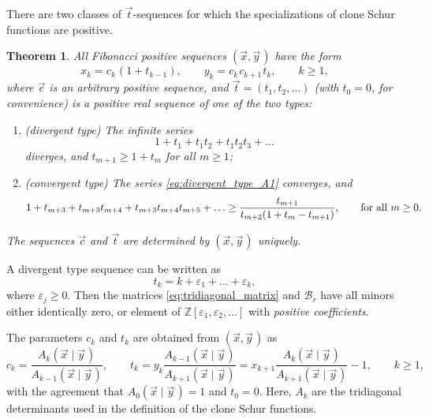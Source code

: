 \documentclass[letterpaper,11pt,oneside,reqno]{article}
\numberwithin{equation}{section}
\newcommand{\ssp}{\hspace{1pt}}
\newtheorem{theorem}[proposition]{Theorem}
\theoremstyle{definition}
\begin{document}
There are two classes of $\vec t$-sequences for which the
specializations of clone Schur functions are positive.
\begin{theorem}
	All Fibonacci positive sequences
	$(\vec x,\vec{y}\ssp)$
	have the form
	\begin{equation*}
		x_k=c_k\ssp (1+t_{k-1}),\qquad y_k=c_k\ssp c_{k+1}\ssp t_k, \qquad k\ge1,
	\end{equation*}
	where $\vec c$ is an
	arbitrary positive sequence,
	and $\vec t=(t_1,t_2,\ldots )$ (with $t_0=0$, for convenience) is
	a positive real sequence of one of the two types:
	\begin{enumerate}[$\bullet$]
		\item (divergent type)
			The infinite series
			\begin{equation}
				\label{eq:divergent_type_A1}
				1+t_1+t_1t_2+t_1t_2t_3+\ldots
			\end{equation}
			diverges, and
			$t_{m+1}\ge 1+t_m$ for all $m\ge 1$;
		\item (convergent type)
			The series \eqref{eq:divergent_type_A1} converges, and
			\begin{equation*}
				 1+t_{m+3}+t_{m+3}t_{m+4}+
				t_{m+3}t_{m+4}t_{m+5}+\ldots
				\ge
				\frac{t_{m+1}}{t_{m+2}(1+t_m-t_{m+1})}
				,
				\qquad
				\textnormal{for all }
				m\ge0.
			\end{equation*}
	\end{enumerate}
	The sequences $\vec c$ and $\vec t$ are determined by $(\vec x,\vec{y}\ssp)$ uniquely.
\end{theorem}

A divergent type sequence can be written
as
\begin{equation*}
	t_k=k+\varepsilon_1+\ldots+\varepsilon_k ,
\end{equation*}
where $\varepsilon_j\ge 0$. Then the matrices
\eqref{eq:tridiagonal_matrix} and $\mathcal{B}_r$
have all minors either identically zero,
or element of $\mathbb{Z}[\varepsilon_1,\varepsilon_2,\ldots ]$
with \emph{positive coefficients}.

The parameters $c_k$ and $t_k$ are obtained from $(\vec x,\vec{y}\ssp)$ as
\begin{equation*}
	c_k=\frac{A_{k}(\vec x\mid \vec{y}\ssp)}{A_{k-1}(\vec x\mid \vec{y}\ssp)},\qquad
	t_k=y_k\frac{A_{k-1}(\vec x\mid \vec{y}\ssp)}{A_{k+1}(\vec x\mid \vec{y}\ssp)}
	=x_{k+1}\frac{A_k(\vec x\mid \vec{y}\ssp)}{A_{k+1}(\vec x\mid \vec{y}\ssp)}-1
	,\qquad k\ge1,
\end{equation*}
with the agreement that $A_0(\vec x\mid \vec{y}\ssp)=1$ and $t_0=0$.
Here, $A_k$ are the tridiagonal determinants used in the definition of the clone Schur functions.
\end{document}
